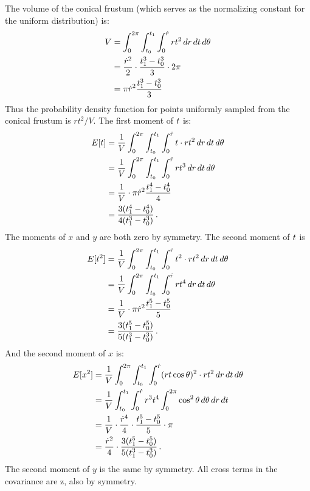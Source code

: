 \documentclass[10pt,twocolumn,letterpaper]{article}
\begin{document}
The volume of the conical frustum (which serves as the normalizing constant for the uniform distribution) is:
\begin{align}
    V &= \int_{0}^{2\pi} \int_{t_0}^{t_1} \int_{0}^{\dot r} r t^2 \, dr \, dt \, d\theta \\
    &= \frac{\dot r^2}{2} \cdot \frac{t_1^3 - t_0^3}{3}\cdot 2\pi \\
    &= \pi \dot r^2 \frac{t_1^3 - t_0^3}{3} 
\end{align}
Thus the probability density function for points uniformly sampled from the conical frustum is $rt^2 / V$.
The first moment of $t$ is:
\begin{align}
    E[t] &= \frac{1}{V} \int_{0}^{2\pi} \int_{t_0}^{t_1} \int_{0}^{\dot r} t \cdot r t^2 \, dr \, dt \, d\theta \\
    &= \frac{1}{V} \int_{0}^{2\pi} \int_{t_0}^{t_1} \int_{0}^{\dot r}  r t^3 \, dr \, dt \, d\theta \\
    &= \frac{1}{V} \cdot \pi \dot r^2 \frac{t_1^4 - t_0^4}{4} \\
    &= \frac{3(t_1^4 - t_0^4)}{4(t_1^3 - t_0^3)} \, .
\end{align}
The moments of $x$ and $y$ are both zero by symmetry.
The second moment of $t$ is
\begin{align}
    E[t^2] &= \frac{1}{V} \int_{0}^{2\pi} \int_{t_0}^{t_1} \int_{0}^{\dot r} t^2 \cdot r t^2 \, dr \, dt \, d\theta \\
    &= \frac{1}{V} \int_{0}^{2\pi} \int_{t_0}^{t_1} \int_{0}^{\dot r}  r t^4 \, dr \, dt \, d\theta \\
    &= \frac{1}{V} \cdot \pi \dot r^2 \frac{t_1^5 - t_0^5}{5} \\
    &= \frac{3(t_1^5 - t_0^5)}{5(t_1^3 - t_0^3)} \, .
\end{align}
And the second moment of $x$ is:
\begin{align}
    E[x^2] &= \frac{1}{V} \int_{0}^{2\pi} \int_{t_0}^{t_1} \int_{0}^{\dot r} (rt\cos\theta)^2 \cdot r t^2 \, dr \, dt \, d\theta \\
    &= \frac{1}{V} \int_{t_0}^{t_1} \int_{0}^{\dot r}  r^3 t^4 \int_{0}^{2\pi}  \cos^2\theta \, d\theta \, dr \, dt \\
    &= \frac{1}{V} \cdot \frac{\dot r^4}{4} \cdot \frac{t_1^5 - t_0^5}{5} \cdot \pi \\
    &= \frac{\dot r^2}{4} \cdot \frac{3(t_1^5 - t_0^5)}{5(t_1^3 - t_0^3)} \, .
\end{align}
The second moment of $y$ is the same by symmetry. All cross terms in the covariance are z, also by symmetry.
\end{document}
